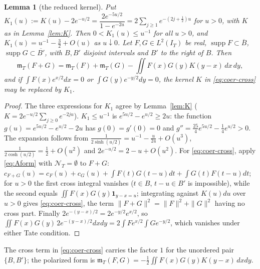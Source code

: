 \documentclass[11pt]{amsart}
\newtheorem{lemma}[theorem]{Lemma}
\theoremstyle{definition}
\theoremstyle{remark}
\newcommand{\supp}{\operatorname{supp}}
\newcommand{\IT}{I_T}
\newcommand{\cF}{c_F}
\newcommand{\NT}{\mathcal N_T}
\newcommand{\mT}{\mathfrak m_T}
\begin{document}
\begin{lemma}[the reduced kernel]\label{lem:coer-K1}
Put $K_1(u):=K(u)-2e^{-u/2}=\dfrac{2e^{-5u/2}}{1-e^{-2u}}=2\sum_{j\ge1}e^{-(2j+\frac12)u}$ for $u>0$, with $K$ as in
Lemma~\ref{lem:K}. Then $0<K_1(u)\le u^{-1}$ for all $u>0$, and $K_1(u)=u^{-1}-\frac32+O(u)$ as $u\downarrow0$. Let
$F,G\in L^2(\IT)$ be real, $\supp F\subset\overline B$, $\supp G\subset\overline{B'}$, with $B,B'$ disjoint intervals and $B'$
to the right of $B$. Then
\begin{equation}\label{eq:coer-cross}
\mT(F+G)=\mT(F)+\mT(G)-\iint F(x)G(y)K(y-x)\,dx\,dy ,
\end{equation}
and if $\int F(x)e^{x/2}dx=0$ or $\int G(y)e^{-y/2}dy=0$, the kernel $K$ in \eqref{eq:coer-cross} may be replaced by $K_1$.
\end{lemma}
\begin{proof}
The three expressions for $K_1$ agree by Lemma~\ref{lem:K} ($K=2e^{-u/2}\sum_{j\ge0}e^{-2ju}$). $K_1\le u^{-1}$ is
$e^{5u/2}-e^{u/2}\ge2u$: the function $g(u)=e^{5u/2}-e^{u/2}-2u$ has $g(0)=g'(0)=0$ and
$g''=\frac{25}4e^{5u/2}-\frac14e^{u/2}>0$. The expansion follows from $\frac1{2\sinh(u/2)}=u^{-1}-\frac u{24}+O(u^3)$,
$\frac1{2\cosh(u/2)}=\frac12+O(u^2)$ and $2e^{-u/2}=2-u+O(u^2)$. For \eqref{eq:coer-cross}, apply \eqref{eq:Aform} with
$\NT=\emptyset$ to $F+G$: $c_{F+G}(u)=\cF(u)+c_G(u)+\int F(t)G(t-u)dt+\int G(t)F(t-u)dt$; for $u>0$ the first cross
integral vanishes ($t\in B$, $t-u\in B'$ is impossible), while the second equals $\iint F(x)G(y)\mathbf 1_{y-x=u}$; integrating
against $K(u)du$ over $u>0$ gives \eqref{eq:coer-cross}, the term $\|F+G\|^2=\|F\|^2+\|G\|^2$ having no cross part.
Finally $2e^{-(y-x)/2}=2e^{-y/2}e^{x/2}$, so $\iint F(x)G(y)\,2e^{-(y-x)/2}dxdy=2\int Fe^{x/2}\int Ge^{-y/2}$, which vanishes
under either Tate condition.
\end{proof}
The cross term in \eqref{eq:coer-cross} carries the factor $1$ for the unordered pair $\{B,B'\}$; the polarized form is
$\mT(F,G)=-\frac12\iint F(x)G(y)K(y-x)\,dxdy$.
\end{document}
